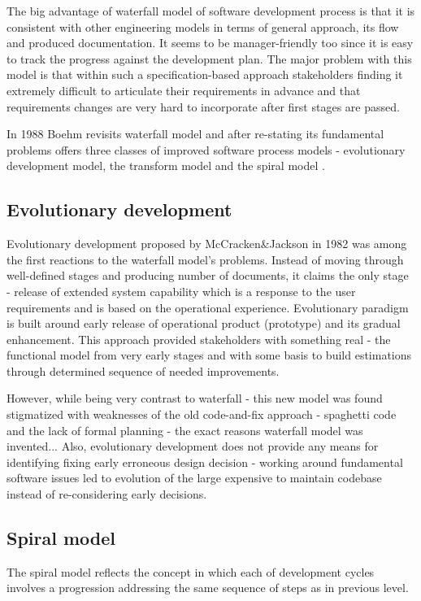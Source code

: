 The big advantage of waterfall model of software development process is that 
it is consistent with other engineering models in terms of general approach, 
its flow and produced documentation. It seems to be manager-friendly too since
it is easy to track the progress against the development plan. The major 
problem with this model is
that within such a specification-based approach stakeholders finding it 
extremely difficult to articulate their requirements in advance and 
that requirements changes are very hard to incorporate after first stages are passed.

In 1988 Boehm revisits waterfall model and after re-stating its fundamental problems 
offers three classes of improved software process models - evolutionary development 
model, the transform model and the spiral model \cite{citeulike:10002126}.

\subsection{Evolutionary development}
Evolutionary development proposed by McCracken\&Jackson in 1982 \cite{citeulike:3996892}
was among the first reactions to the waterfall model's problems. Instead of moving 
through well-defined stages and producing number of documents, it claims the only
stage - release of extended system capability which is a response to the user 
requirements and is based on the operational experience. Evolutionary paradigm 
is built around early release of operational product (prototype) and its gradual 
enhancement. This approach provided stakeholders with something real - the functional 
model from very early stages and with some basis to build estimations through 
determined sequence of needed improvements.

However, while being very contrast to waterfall - this new model was found stigmatized 
with weaknesses of the old code-and-fix approach - spaghetti code and the lack of 
formal planning - the exact reasons waterfall model was invented... Also, 
evolutionary development does not provide any means for identifying fixing early 
erroneous design decision - working around fundamental software issues led to 
evolution of the large expensive to maintain codebase instead of re-considering 
early decisions.


\subsection{Spiral model}
The spiral model reflects the concept in which each of development cycles involves a 
progression addressing the same sequence of steps as in previous level.


